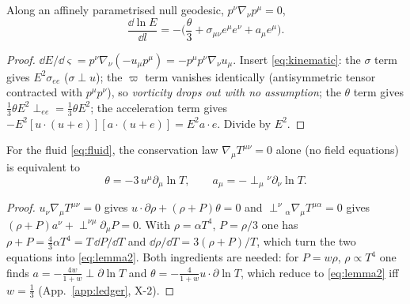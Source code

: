 \begin{lemma}\label{lem:kin}
Along an affinely parametrised null geodesic, $p^\nu\nabla_\nu p^\mu=0$,
\begin{equation}
\frac{\dd\ln E}{\dd l}=-\Big(\frac\theta3+\sigma_{\mu\nu}e^\mu e^\nu+a_\mu e^\mu\Big).
\label{eq:lemma1}
\end{equation}
\end{lemma}
\begin{proof}
$\dd E/\dd\varsigma=p^\nu\nabla_\nu(-u_\mu p^\mu)=-p^\mu p^\nu\nabla_\nu u_\mu$.  Insert \eqref{eq:kinematic}:
the $\sigma$ term gives $E^2\sigma_{ee}$ ($\sigma\perp u$); the $\varpi$ term vanishes identically (antisymmetric
tensor contracted with $p^\mu p^\nu$), so \emph{vorticity drops out with no assumption}; the $\theta$ term gives
$\tfrac13\theta E^2\perp_{ee}=\tfrac13\theta E^2$; the acceleration term gives
$-E^2[u\cdot(u+e)][a\cdot(u+e)]=E^2a\cdot e$.  Divide by $E^2$.
\end{proof}

\begin{lemma}\label{lem:fluid}
For the fluid \eqref{eq:fluid}, the conservation law $\nabla_\mu T^{\mu\nu}=0$ alone (no field equations)
is equivalent to
\begin{equation}
\theta=-3\,u^\mu\partial_\mu\ln T,\qquad a_\mu=-\perp_\mu{}^\nu\partial_\nu\ln T .
\label{eq:lemma2}
\end{equation}
\end{lemma}
\begin{proof}
$u_\nu\nabla_\mu T^{\mu\nu}=0$ gives $u\cdot\partial\rho+(\rho+P)\theta=0$ and
$\perp^\nu{}_\alpha\nabla_\mu T^{\mu\alpha}=0$ gives $(\rho+P)a^\nu+\perp^{\nu\mu}\partial_\mu P=0$.  With
$\rho=\alpha T^4$, $P=\rho/3$ one has $\rho+P=\tfrac43\alpha T^4=T\,\dd P/\dd T$ and
$\dd\rho/\dd T=3(\rho+P)/T$, which turn the two equations into \eqref{eq:lemma2}.  Both ingredients are
needed: for $P=w\rho$, $\rho\propto T^4$ one finds $a=-\tfrac{4w}{1+w}\perp\partial\ln T$ and
$\theta=-\tfrac4{1+w}u\cdot\partial\ln T$, which reduce to \eqref{eq:lemma2} iff $w=\tfrac13$
(App.~\ref{app:ledger}, X-2).
\end{proof}

